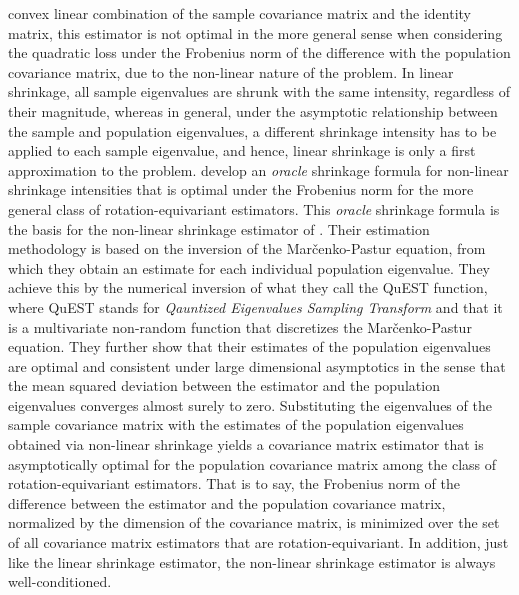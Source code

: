 convex linear combination of the sample covariance matrix and the identity matrix, this estimator is not optimal in the more general sense when considering the quadratic loss under the Frobenius norm of the difference with the population covariance matrix, due to the non-linear nature of the problem. In linear shrinkage, all sample eigenvalues are shrunk with the same intensity, regardless of their magnitude, whereas in general, under the asymptotic relationship between the sample and population eigenvalues, a different shrinkage intensity has to be applied to each sample eigenvalue, and hence, linear shrinkage is only a first approximation to the problem. \textcite{LEDOITPECHE2011} develop an \textit{oracle} shrinkage formula for non-linear shrinkage intensities that is optimal under the Frobenius norm for the more general class of rotation-equivariant estimators. This \textit{oracle} shrinkage formula is the basis for the non-linear shrinkage estimator of \textcite{LEDOITWOLF2015}. Their estimation methodology is based on the inversion of the Marčenko-Pastur equation, from which they obtain an estimate for each individual population eigenvalue. They achieve this by the numerical inversion of what they call the QuEST function, where QuEST stands for \textit{Qauntized Eigenvalues Sampling Transform} and that it is a multivariate non-random function that discretizes the Marčenko-Pastur equation. They further show that their estimates of the population eigenvalues are optimal and consistent under large dimensional asymptotics in the sense that the mean squared deviation between the estimator and the population eigenvalues converges almost surely to zero. Substituting the eigenvalues of the sample covariance matrix with the estimates of the population eigenvalues obtained via non-linear shrinkage yields a covariance matrix estimator that is asymptotically optimal for the population covariance matrix among the class of rotation-equivariant estimators. That is to say, the Frobenius norm of the difference between the estimator and the population covariance matrix, normalized by the dimension of the covariance matrix, is minimized over the set of all covariance matrix estimators that are rotation-equivariant. In addition, just like the linear shrinkage estimator, the non-linear shrinkage estimator is always well-conditioned.

